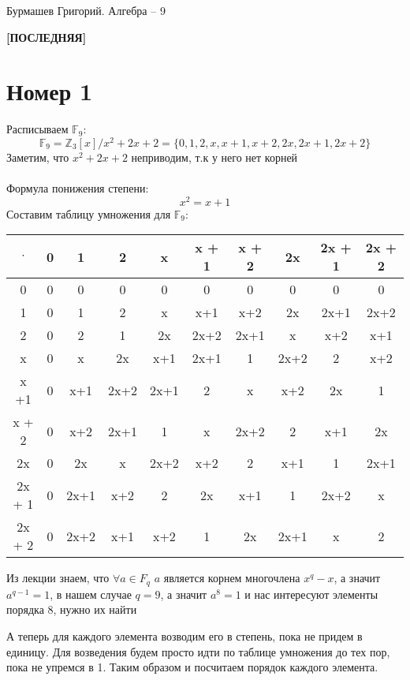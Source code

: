 \documentclass[a4paper,12pt]{article}
\author{Бурмашев Григорий, БПМИ-208}
\title{}
\date{\today}
\begin{document}
\begin{center}
Бурмашев Григорий. Алгебра -- 9
\end{center}
\begin{center}
\textbf{[ПОСЛЕДНЯЯ]}
\end{center}
\section*{Номер 1}
Расписываем $\mathbb{F}_9$:
\[
\mathbb{F}_9 = \mathbb{Z}_3[x]/x^2 +2x + 2 = \{0, 1, 2, x, x + 1, x + 2, 2x, 2x + 1, 2x + 2\}
\]
Заметим,  что $x^2 + 2x + 2$ неприводим, т.к у него нет корней
\\\\
Формула понижения степени:
\[
x^2 = x + 1 
\]
Составим таблицу умножения для $\mathbb{F}_9$:

\begin{center}
\begin{tabular}{|c|c|c|c|c|c|c|c|c|c|}
\hline
$\cdot$& 0 & 1 & 2 & x & x + 1 & x + 2 & 2x & 2x + 1 & 2x + 2 \\
\hline
0 & 0 & 0 & 0 & 0 & 0 & 0 & 0 & 0 & 0 \\
\hline
1 & 0 & 1 & 2 & x & x+1 & x+2 & 2x & 2x+1 & 2x+2 \\
\hline
2 & 0 & 2 & 1 & 2x & 2x+2 & 2x+1 & x & x+2 & x+1 \\
\hline
x & 0 & x & 2x & x+1 & 2x+1 & 1 & 2x+2 & 2 & x+2 \\
\hline
x +1  & 0 & x+1 & 2x+2 & 2x+1 & 2 & x & x+2 & 2x & 1 \\
\hline
x + 2 & 0 & x+2 & 2x+1 & 1 & x & 2x+2 & 2 & x+1 & 2x \\
\hline
2x & 0 & 2x & x & 2x+2 & x+2 & 2 & x+1 & 1 & 2x+1 \\
\hline
2x + 1 & 0 & 2x+1 & x+2 & 2 & 2x & x+1 & 1 & 2x+2 & x \\
\hline
2x + 2 & 0 & 2x+2 & x+1 & x+2 & 1 & 2x & 2x+1 & x & 2 \\
\hline
\end{tabular}
\end{center}

Из лекции знаем, что $\forall a \in F_q$ $a$ является корнем многочлена $x^q - x$, а значит $a^{q-1} = 1$, в нашем случае $q = 9$, а значит $a^8 = 1$ и нас интересуют элементы порядка 8, нужно их найти
\clearpage

А теперь для каждого элемента возводим его в степень, пока не придем в единицу. Для возведения будем просто идти по таблице умножения до тех пор, пока не упремся в 1.  Таким образом и посчитаем порядок каждого элемента.
\end{document}
